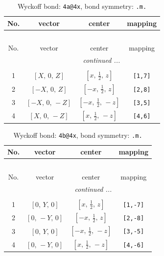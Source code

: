 \documentclass[fleqn,8pt]{jsarticle}
\begin{document}
\begin{longtable}{cccc}
\caption{Wyckoff bond: {\tt 4a@4x}, bond symmetry: {\tt .m.}}
 \\
 \hline \hline
No. & vector & center & mapping \\ \hline \endfirsthead

\multicolumn{3}{l}{\tablename\ \thetable{}} \\
 \hline \hline
No. & vector & center & mapping \\ \hline \endhead

 \hline \hline
\multicolumn{3}{r}{\footnotesize\it continued ...} \\ \endfoot

 \hline \hline
\multicolumn{3}{r}{} \\ \endlastfoot

1 & $\left[ X,\, 0,\, Z \right]$ & $\left[ x,\, \frac{1}{2},\, z \right]$ & {\tt [1,7]} \\ \hline
2 & $\left[ - X,\, 0,\, Z \right]$ & $\left[ - x,\, \frac{1}{2},\, z \right]$ & {\tt [2,8]} \\ \hline
3 & $\left[ - X,\, 0,\, - Z \right]$ & $\left[ - x,\, \frac{1}{2},\, - z \right]$ & {\tt [3,5]} \\ \hline
4 & $\left[ X,\, 0,\, - Z \right]$ & $\left[ x,\, \frac{1}{2},\, - z \right]$ & {\tt [4,6]} \\
\end{longtable}
\renewcommand{\arraystretch}{1.2}
\begin{longtable}{cccc}
\caption{Wyckoff bond: {\tt 4b@4x}, bond symmetry: {\tt .m.}}
 \\
 \hline \hline
No. & vector & center & mapping \\ \hline \endfirsthead

\multicolumn{3}{l}{\tablename\ \thetable{}} \\
 \hline \hline
No. & vector & center & mapping \\ \hline \endhead

 \hline \hline
\multicolumn{3}{r}{\footnotesize\it continued ...} \\ \endfoot

 \hline \hline
\multicolumn{3}{r}{} \\ \endlastfoot

1 & $\left[ 0,\, Y,\, 0 \right]$ & $\left[ x,\, \frac{1}{2},\, z \right]$ & {\tt [1,-7]} \\ \hline
2 & $\left[ 0,\, - Y,\, 0 \right]$ & $\left[ - x,\, \frac{1}{2},\, z \right]$ & {\tt [2,-8]} \\ \hline
3 & $\left[ 0,\, Y,\, 0 \right]$ & $\left[ - x,\, \frac{1}{2},\, - z \right]$ & {\tt [3,-5]} \\ \hline
4 & $\left[ 0,\, - Y,\, 0 \right]$ & $\left[ x,\, \frac{1}{2},\, - z \right]$ & {\tt [4,-6]} \\
\end{longtable}
\end{document}
